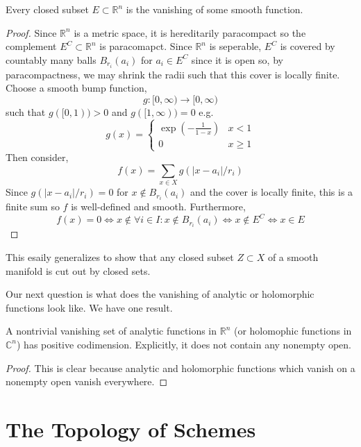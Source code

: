 \documentclass[12pt]{article}
\begin{document}
\newcommand{\R}{\mathbb{R}}

\begin{theorem}
Every closed subset $E \subset \R^n$ is the vanishing of some smooth function.
\end{theorem}

\begin{proof}
Since $\R^n$ is a metric space, it is hereditarily paracompact so the complement $E^C \subset \R^n$ is paracomapct. Since $\R^n$ is seperable, $E^C$ is covered by countably many balls $B_{r_i}(a_i)$ for $a_i \in E^C$ since it is open so, by paracompactness, we may shrink the radii such that this cover is locally finite. Choose a smooth bump function, 
\[ g : [0, \infty) \to [0, \infty) \]
such that $g([0, 1)) > 0$ and $g([1, \infty)) = 0$ e.g. 
\[ g(x) = 
\begin{cases}
\exp{\left( - \frac{1}{1 - x} \right)} & x < 1
\\
0 & x \ge 1
\end{cases} \]
Then consider,
\[ f(x) = \sum_{x \in X} g(|x - a_i|/r_i) \]
Since $g(|x - a_i|/r_i) = 0$ for $x \notin B_{r_i}(a_i)$ and the cover is locally finite, this is a finite sum so $f$ is well-defined and smooth. Furthermore, 
\[ f(x) = 0 \iff x \notin \forall i \in I : x \notin B_{r_i}(a_i) \iff x \notin E^C \iff x \in E \]
\end{proof}

\begin{rmk}
This esaily generalizes to show that any closed subset $Z \subset X$ of a smooth manifold is cut out by closed sets.
\end{rmk}
\noindent
Our next question is what does the vanishing of analytic or holomorphic functions look like. We have one result.

\begin{prop}
A nontrivial vanishing set of analytic functions in $\R^n$ (or holomophic functions in $\mathbb{C}^n$) has positive codimension. Explicitly, it does not contain any nonempty open. 
\end{prop}

\begin{proof}
This is clear because analytic and holomorphic functions which vanish on a nonempty open vanish everywhere. 
\end{proof}

\section{The Topology of Schemes}
\end{document}
